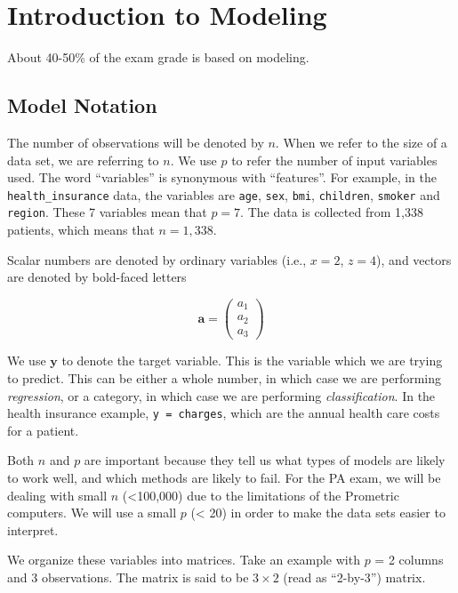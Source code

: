 \documentclass[openany]{book}
\begin{document}
\hypertarget{introduction-to-modeling}{%
\chapter{Introduction to Modeling}\label{introduction-to-modeling}}

About 40-50\% of the exam grade is based on modeling.

\hypertarget{model-notation}{%
\section{Model Notation}\label{model-notation}}

The number of observations will be denoted by \(n\). When we refer to the size of a data set, we are referring to \(n\). We use \(p\) to refer the number of input variables used. The word ``variables'' is synonymous with ``features''. For example, in the \texttt{health\_insurance} data, the variables are \texttt{age}, \texttt{sex}, \texttt{bmi}, \texttt{children}, \texttt{smoker} and \texttt{region}. These 7 variables mean that \(p = 7\). The data is collected from 1,338 patients, which means that \(n = 1,338\).

Scalar numbers are denoted by ordinary variables (i.e., \(x = 2\), \(z = 4\)), and vectors are denoted by bold-faced letters

\[\mathbf{a} = \begin{pmatrix} a_1 \\ a_2 \\ a_3 \end{pmatrix}\]

We use \(\mathbf{y}\) to denote the target variable. This is the variable which we are trying to predict. This can be either a whole number, in which case we are performing \emph{regression}, or a category, in which case we are performing \emph{classification}. In the health insurance example, \texttt{y\ =\ charges}, which are the annual health care costs for a patient.

Both \(n\) and \(p\) are important because they tell us what types of models are likely to work well, and which methods are likely to fail. For the PA exam, we will be dealing with small \(n\) (\textless100,000) due to the limitations of the Prometric computers. We will use a small \(p\) (\textless{} 20) in order to make the data sets easier to interpret.

We organize these variables into matrices. Take an example with \(p\) = 2 columns and 3 observations. The matrix is said to be \(3 \times 2\) (read as ``2-by-3'') matrix.
\end{document}

